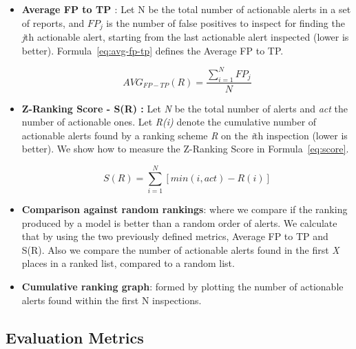 \begin{itemize}
	\item \textbf{Average FP to TP \cite{correlation_exploitation}}: Let N be the total number of actionable alerts in a set of reports, and $FP_j$ is the number of false positives to inspect for finding the \textit{j}th actionable alert, starting from the last actionable alert inspected (lower is better). Formula~\ref{eq:avg-fp-tp} defines the Average FP to TP.
	
	\begin{equation} \label{eq:avg-fp-tp}
		\mathit{AVG_{FP-TP}}(R) = \frac{\sum_{i=1}^{N} FP_j}{N}
	\end{equation}

	
	\item \textbf{Z-Ranking Score - S(R) \cite{z-ranking}:} 
Let \textit{N} be the total number of alerts and \textit{act} the number of actionable ones. Let \textit{R(i)} denote the cumulative number of actionable alerts found by a ranking scheme \textit{R} on the \textit{i}th inspection (lower is better). We show how to measure the Z-Ranking Score in Formula~\ref{eq:score}. 

	\begin{equation} \label{eq:score}
	S(R) = \sum_{i=1}^{N} [\mathit{min}(i,\mathit{act}) - R(i)]
	\end{equation}
	\item \textbf{Comparison against random rankings}: where we compare if the ranking produced by a model is better than a random order of alerts. We calculate that by using the two previously defined metrics, Average FP to TP and S(R).
	Also we compare the number of actionable alerts found in the first \textit{X} places in a ranked list, compared to a random list.
	\item \textbf{Cumulative ranking graph}: formed by plotting the number of actionable alerts found within the first N inspections.
\end{itemize}

\subsection{Evaluation Metrics}

